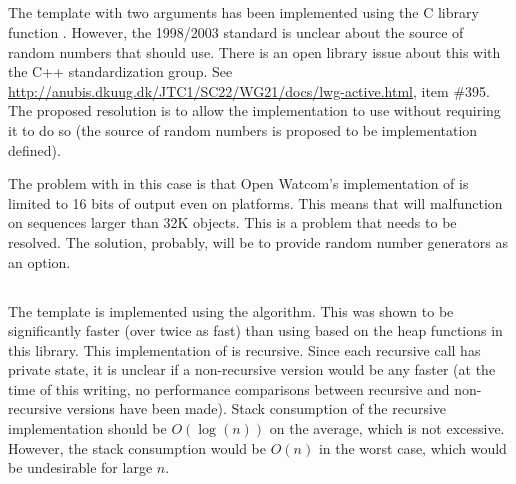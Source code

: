 \subsection[\texttt{random\_shuffle}]{}

The  template with two arguments has been implemented
using the C library function . However, the 1998/2003 standard is
unclear about the source of random numbers that  should
use. There is an open library issue about this with the C++ standardization
group. See \url{http://anubis.dkuug.dk/JTC1/SC22/WG21/docs/lwg-active.html},
item \#395. The proposed resolution is to allow the implementation to use
 without requiring it to do so (the source of random numbers is
proposed to be implementation defined).

The problem with  in this case is that Open Watcom's implementation
of  is limited to 16 bits of output even on 
platforms. This means that  will malfunction on sequences
larger than 32K objects. This is a problem that needs to be resolved. The
solution, probably, will be to provide  random number generators
as an option. 

\subsection[\texttt{sort}]{}

The  template is implemented using the 
algorithm. This was shown to be significantly faster (over twice as fast) than
using  based on the heap functions in this library. This
implementation of  is recursive. Since each recursive
call has private state, it is unclear if a non-recursive version would be any
faster (at the time of this writing, no performance comparisons between
recursive and non-recursive versions have been made). Stack consumption of the
recursive implementation should be $O(\log(n))$ on the average, which is not
excessive. However, the stack consumption would be $O(n)$ in the worst case,
which would be undesirable for large $n$.
